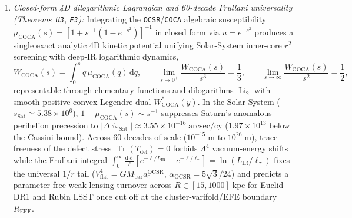 \documentclass[11pt]{article}
\begin{document}
\begin{enumerate}
\begin{equation}
  \label{eq:viia-covdir-action}
\end{equation}
where the spatial triad $\{e_I^\mu\}_{I=1}^3$ enters $P^{\mu\nu}=\delta^{IJ}e_I^\mu e_J^\nu$ as a pure $SO(3)$ frame gauge redundancy (\texttt{C1}), while the acoustic metric $G_{\mathrm{eff}}^{\mu\nu}=W'(s)P^{\mu\nu}+sW''(s)\hat{n}^\mu\hat{n}^\nu$ satisfies strict spatial ellipticity ($W'(s)>0$, $W'(s)+sW''(s)>0$) and luminal tensor propagation $c_T^2=1$ (\texttt{C4}). On the discrete $K_4$ star lattice (\texttt{C2}), an off-center baryon sources the screened singlet Yukawa potential $\delta m(r)=-(g_{\mathrm{bar}}/4\pi r)e^{-m_{\mathrm{eff}}r}$ whose self-force vanishes identically for a symmetric profile and stays strictly finite under asymmetry ($|F_{\mathrm{self}}|\le\frac{1}{2}GMm_{\mathrm{eff}}^2<\infty$). Crucially (\texttt{C3}), diffeomorphism invariance enforces $\nabla_\mu(T_{\mathrm{bar}}^{\mu\nu}+T_{\mathrm{dir}}^{\mu\nu})=0$: for unequal-mass binaries or colliding subclusters ($M_1\neq M_2$), the nonlinear dielectric reaction stress tensor $T_{\mathrm{react}}^{\mu\nu}$ carries the exact equal-and-opposite recoil $F_1^z+F_2^z=0$, forbidding self-acceleration identically.
\item \emph{Closed-form 4D dilogarithmic Lagrangian and 60-decade Frullani universality (Theorems~\texttt{U3}, \texttt{F3}):} Integrating the \texttt{OCSR}/\texttt{COCA} algebraic susceptibility $\mu_{\mathrm{COCA}}(s)=[1+s^{-1}(1-e^{-s^2})]^{-1}$ in closed form via $u=e^{-s^2}$ produces a single exact analytic 4D kinetic potential unifying Solar-System inner-core $r^2$ screening with deep-IR logarithmic dynamics,
\begin{equation}
  W_{\mathrm{COCA}}(s)
  = \int_0^s q\,\mu_{\mathrm{COCA}}(q)\,\mathrm{d}q,
  \qquad
  \lim_{s\to 0^+}\frac{W_{\mathrm{COCA}}(s)}{s^3}=\frac{1}{3},
  \qquad
  \lim_{s\to\infty}\frac{W_{\mathrm{COCA}}(s)}{s^2}=\frac{1}{2},
  \label{eq:viia-wcoca-lagrangian}
\end{equation}
representable through elementary functions and dilogarithms $\operatorname{Li}_2$ with smooth positive convex Legendre dual $W_{\mathrm{COCA}}^*(y)$. In the Solar System ($s_{\mathrm{Sat}}\simeq 5.38\times 10^6$), $1-\mu_{\mathrm{COCA}}(s)\sim s^{-1}$ suppresses Saturn's anomalous perihelion precession to $|\Delta\dot{\varpi}_{\mathrm{Sat}}|\approx 3.55\times 10^{-16}\;\mathrm{arcsec/cy}$ ($1.97\times 10^{13}$ below the Cassini bound). Across 60 decades of scale ($10^{-15}\;\mathrm{m}$ to $10^{26}\;\mathrm{m}$), trace-freeness of the defect stress $\operatorname{Tr}(T_{\mathrm{def}})=0$ forbids $\Lambda^4$ vacuum-energy shifts while the Frullani integral $\int_0^\infty\frac{\mathrm{d}\ell}{\ell}[e^{-\ell/L_{\mathrm{IR}}}-e^{-\ell/\ell_\tau}]=\ln(L_{\mathrm{IR}}/\ell_\tau)$ fixes the universal $1/r$ tail ($V_{\mathrm{flat}}^4=GM_{\mathrm{bar}}a_0^{\mathrm{OCSR}}$, $\alpha_{\mathrm{OCSR}}=5\sqrt{3}/24$) and predicts a parameter-free weak-lensing turnover across $R\in[15,1000]\;\mathrm{kpc}$ for Euclid DR1 and Rubin LSST once cut off at the cluster-varifold/EFE boundary $R_{\mathrm{EFE}}$.

\end{enumerate}
\end{document}
